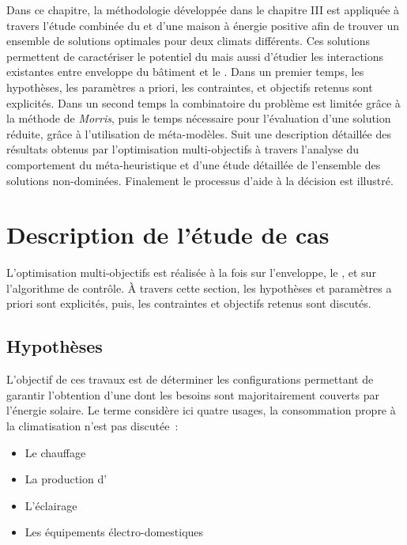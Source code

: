 


Dans ce chapitre, la méthodologie développée dans le chapitre III est appliquée
à travers l’étude combinée du  et d’une maison à énergie positive afin de trouver
un ensemble de solutions optimales pour deux climats différents. Ces solutions permettent de caractériser le potentiel
du  mais aussi d’étudier les interactions existantes entre enveloppe du bâtiment et le .
Dans un premier temps, les hypothèses, les paramètres a priori,
les contraintes, et objectifs retenus sont explicités. Dans un second temps la combinatoire
du problème est limitée grâce à la méthode de \textit{Morris}, puis le temps nécessaire
pour l’évaluation d’une solution réduite, grâce à l’utilisation de méta-modèles.
Suit une description détaillée des résultats obtenus par l’optimisation multi-objectifs
à travers l’analyse du comportement du méta-heuristique et d’une étude détaillée
de l’ensemble des solutions non-dominées. Finalement le processus d’aide à la décision est
illustré.
\clearpage


\section{Description de l’étude de cas} %
\label{sec:description_de_l_etude_de_cas}
L’optimisation multi-objectifs est réalisée à la fois sur l’enveloppe, le ,
et sur l’algorithme de contrôle.
À travers cette section, les hypothèses et paramètres a priori sont explicités, puis, les
contraintes et objectifs retenus sont discutés.


\subsection{Hypothèses} %
\label{sub:hypotheses_optimization}
L’objectif de ces travaux est de déterminer les configurations permettant
de garantir l’obtention d’une  dont les besoins sont majoritairement couverts
par l’énergie solaire. Le terme  considère ici quatre usages, la consommation
propre à la climatisation n’est pas discutée~:
\begin{itemize}
  \item Le chauffage
  \item La production d’
  \item L’éclairage
  \item Les équipements électro-domestiques
\end{itemize}

